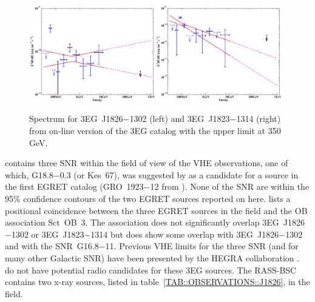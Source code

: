 \begin{figure}[p]
\includegraphics[angle=270,width=0.49\textwidth]{plots/chap-observations/spectra/3EG_J1826-1302.pdf}\hspace*{\fill}\includegraphics[angle=270,width=0.49\textwidth]{plots/chap-observations/spectra/3EG_J1823-1314.pdf}
\caption{\label{FIG::OBSERVATIONS::J1826SPEC} Spectrum for 
3EG~J1826$-$1302 (left) and 3EG~J1823$-$1314 (right) from on-line
version of the 3EG catalog with the upper limit at 350\,GeV.}
\end{figure}

\citet{REF::GREEN::WEB2001} contains three SNR within the field of
view of the VHE observations, one of which, G18.8$-$0.3 (or Kes~67),
was suggested by \citet{REF::STURNER_DERMER::AA1995} as a candidate
for a source in the first EGRET catalog (GRO~1923$-$12 from
\citealt{REF::FICHTEL::APJS1994}). None of the SNR are within
the 95\% confidence contours of the two EGRET sources reported on
here. \citet{REF::ROMERO::AA1999} lists a positional coincidence
between the three EGRET sources in the field and the OB association
Sct~OB~3. The association does not significantly overlap
3EG~J1826$-$1302 or 3EG~J1823$-$1314 but does show some overlap with
3EG~J1826$-$1302 and with the SNR~G16.8$-$11. Previous VHE limits for
the three SNR (and for many other Galactic SNR) have been presented by
the HEGRA collaboration \citep{REF::AHARONIAN::AA2002}.
\citet{REF::MATTOX::APJS2001} do not have potential
radio candidates for these 3EG sources. The RASS-BSC contains two
x-ray sources, listed in table~\ref{TAB::OBSERVATIONS::J1826}, in the
field.

